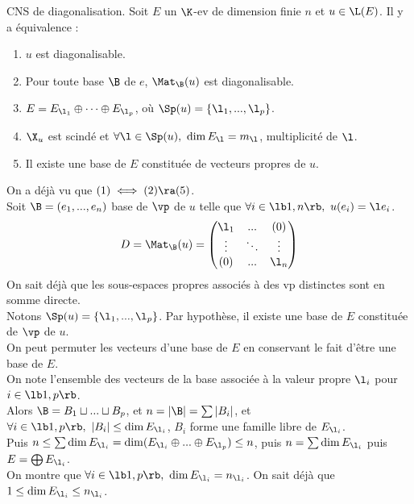 \documentclass[11pt]{article}
\begin{document}
\vspace*{-0.7cm}

\begin{prop}{CNS de diagonalisation.}{}
    Soit $E$ un $\K$-ev de dimension finie $n$ et $u\in\L(E)$. Il y a équivalence :
    \begin{enumerate}
        \item $u$ est diagonalisable.
        \item Pour toute base $\B$ de $e$, $\Mat_\B(u)$ est diagonalisable.
        \item $E=E_{\l_1}\oplus\dots \oplus E_{\l_p}$, où $\Sp(u)=\{\l_1,...,\l_p\}$.
        \item $\X_u$ est scindé et $\forall \l \in \Sp(u), ~ \dim E_{\l} = m_\l$, multiplicité de $\l$.
        \item Il existe une base de $E$ constituée de vecteurs propres de $u$.
    \end{enumerate}
    \tcblower
    On a déjà vu que $(1)\iff(2)\ra(5)$.\\
     Soit $\B=(e_1,...,e_n)$ base de $\vp$ de $u$ telle que $\forall i \in \lb1,n\rb, ~ u(e_i)=\l e_i$.
    \begin{equation*}
        D = \Mat_\B(u) = \begin{pmatrix}\l_1 & ... & (0) \\ \vdots & \ddots & \vdots \\ (0) & ... & \l_n\end{pmatrix}
    \end{equation*}
     On sait déjà que les sous-espaces propres associés à des vp distinctes sont en somme directe.\\
    Notons $\Sp(u)=\{\l_1,...,\l_p\}$. Par hypothèse, il existe une base de $E$ constituée de $\vp$ de $u$.\\
    On peut permuter les vecteurs d'une base de $E$ en conservant le fait d'être une base de $E$.\\
    On note l'ensemble des vecteurs de la base associée à la valeur propre $\l_i$ pour $i\in\lb1,p\rb$.\\
    Alors $\B=B_1\sqcup ... \sqcup B_p$, et $n=|\B|=\sum|B_i|$, et $\forall i \in \lb1,p\rb, ~ |B_i|\leq\dim E_{\l_i}$, $B_i$ forme une famille libre de $E_{\l_i}$.\\
    Puis $n\leq \sum \dim E_{\l_i}= \dim(E_{\l_i}\oplus...\oplus E_{\l_p})\leq n$, puis $n=\sum \dim E_{\l_i}$ puis $E=\bigoplus E_{\l_i}$.\\
     On montre que $\forall i \in \lb1,p\rb, ~ \dim E_{\l_i} = n_{\l_i}$. On sait déjà que $1\leq \dim E_{\l_i} \leq n_{\l_i}$.\\

\end{prop}
\end{document}
